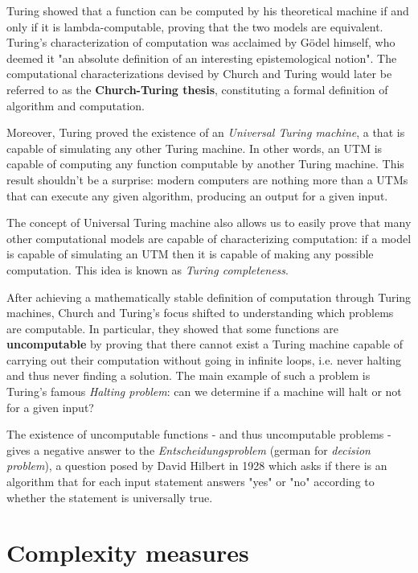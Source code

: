 Turing \cite{turing} showed that a function can be computed by his theoretical machine if and only if it is lambda-computable, proving that the two models are equivalent. Turing's characterization of computation was acclaimed by Gödel himself, who deemed it "an absolute definition of an interesting epistemological notion". The computational characterizations devised by Church and Turing would later be referred to as the \textbf{Church-Turing thesis}, constituting a formal definition of algorithm and computation.

Moreover, Turing proved the existence of an \textit{Universal Turing machine}, a \TM that is capable of simulating any other Turing machine. In other words, an \textsf{UTM} is capable of computing any function computable by another Turing machine. This result shouldn't be a surprise: modern computers are nothing more than a \textsf{UTM}s that can execute any given algorithm, producing an output for a given input.

The concept of Universal Turing machine also allows us to easily prove that many other computational models are capable of characterizing computation: if a model is capable of simulating an \textsf{UTM} then it is capable of making any possible computation. This idea is known as \textit{Turing completeness}.

After achieving a mathematically stable definition of computation through Turing machines, Church and Turing's focus shifted to understanding which problems are computable. In particular, they showed that some functions are \textbf{uncomputable} by proving that there cannot exist a Turing machine capable of carrying out their computation without going in infinite loops, i.e. never halting and thus never finding a solution. The main example of such a problem is Turing's famous \textit{Halting problem}: can we determine if a machine will halt or not for a given input?

The existence of uncomputable functions - and thus uncomputable problems - gives a negative answer to the \textit{Entscheidungsproblem} (german for \textit{decision problem}), a question posed by David Hilbert in 1928 which asks if there is an algorithm that for each input statement answers "yes" or "no" according to whether the statement is universally true.

\newpage

\section{Complexity measures}

